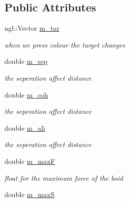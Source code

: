 \subsection*{Public Attributes}
\begin{DoxyCompactItemize}
\item 
\hypertarget{classBoid_aa67dfd45aec40cafb362fdf20c86662f}{
ngl::Vector \hyperlink{classBoid_aa67dfd45aec40cafb362fdf20c86662f}{m\_\-tar}}
\label{classBoid_aa67dfd45aec40cafb362fdf20c86662f}

\begin{DoxyCompactList}\small\item\em when we press colour the target changes \end{DoxyCompactList}\item 
\hypertarget{classBoid_a15d5b1c78243f89cab7d9267b14d6ca9}{
double \hyperlink{classBoid_a15d5b1c78243f89cab7d9267b14d6ca9}{m\_\-sep}}
\label{classBoid_a15d5b1c78243f89cab7d9267b14d6ca9}

\begin{DoxyCompactList}\small\item\em the seperation affect distance \end{DoxyCompactList}\item 
\hypertarget{classBoid_a4c3a20aae303e918b32d0fce5ce099ea}{
double \hyperlink{classBoid_a4c3a20aae303e918b32d0fce5ce099ea}{m\_\-coh}}
\label{classBoid_a4c3a20aae303e918b32d0fce5ce099ea}

\begin{DoxyCompactList}\small\item\em the seperation affect distance \end{DoxyCompactList}\item 
\hypertarget{classBoid_abe5e035909aa3ab0f66bfd692a368f3e}{
double \hyperlink{classBoid_abe5e035909aa3ab0f66bfd692a368f3e}{m\_\-ali}}
\label{classBoid_abe5e035909aa3ab0f66bfd692a368f3e}

\begin{DoxyCompactList}\small\item\em the seperation affect distance \end{DoxyCompactList}\item 
\hypertarget{classBoid_a2509ebc1070253efaa93cfc015b0e39b}{
double \hyperlink{classBoid_a2509ebc1070253efaa93cfc015b0e39b}{m\_\-maxF}}
\label{classBoid_a2509ebc1070253efaa93cfc015b0e39b}

\begin{DoxyCompactList}\small\item\em float for the maximum force of the boid \end{DoxyCompactList}\item 
\hypertarget{classBoid_af3b81b715ad8a748a3fa174003d76714}{
double \hyperlink{classBoid_af3b81b715ad8a748a3fa174003d76714}{m\_\-maxS}}
\label{classBoid_af3b81b715ad8a748a3fa174003d76714}


\end{DoxyCompactItemize}
